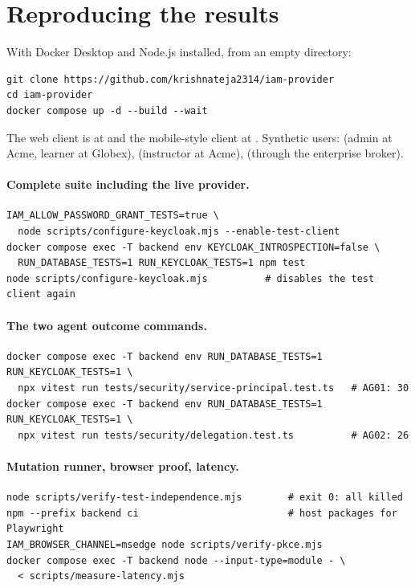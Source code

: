 \section{Reproducing the results}
\label{app:repro}
With Docker Desktop and Node.js installed, from an empty directory:
\begin{verbatim}
git clone https://github.com/krishnateja2314/iam-provider
cd iam-provider
docker compose up -d --build --wait
\end{verbatim}
The web client is at  and the mobile-style client at . Synthetic users:  (admin at Acme, learner at Globex),  (instructor at Acme),  (through the enterprise broker).

\paragraph{Complete suite including the live provider.}
\begin{verbatim}
IAM_ALLOW_PASSWORD_GRANT_TESTS=true \
  node scripts/configure-keycloak.mjs --enable-test-client
docker compose exec -T backend env KEYCLOAK_INTROSPECTION=false \
  RUN_DATABASE_TESTS=1 RUN_KEYCLOAK_TESTS=1 npm test
node scripts/configure-keycloak.mjs          # disables the test client again
\end{verbatim}

\paragraph{The two agent outcome commands.}
\begin{verbatim}
docker compose exec -T backend env RUN_DATABASE_TESTS=1 RUN_KEYCLOAK_TESTS=1 \
  npx vitest run tests/security/service-principal.test.ts   # AG01: 30
docker compose exec -T backend env RUN_DATABASE_TESTS=1 RUN_KEYCLOAK_TESTS=1 \
  npx vitest run tests/security/delegation.test.ts          # AG02: 26
\end{verbatim}

\paragraph{Mutation runner, browser proof, latency.}
\begin{verbatim}
node scripts/verify-test-independence.mjs        # exit 0: all killed
npm --prefix backend ci                          # host packages for Playwright
IAM_BROWSER_CHANNEL=msedge node scripts/verify-pkce.mjs
docker compose exec -T backend node --input-type=module - \
  < scripts/measure-latency.mjs
\end{verbatim}

